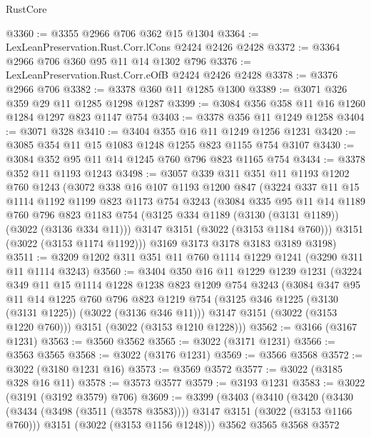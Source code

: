 \begin{lexlean}{RustCore}
\begin{coremodule}
@3360 := @3355 @2966 @706 @362 @15 @1304
@3364 := LexLeanPreservation.Rust.Corr.lCons @2424 @2426 @2428
@3372 := @3364 @2966 @706 @360 @95 @11 @14 @1302 @796
@3376 := LexLeanPreservation.Rust.Corr.eOfB @2424 @2426 @2428
@3378 := @3376 @2966 @706
@3382 := @3378 @360 @11 @1285 @1300
@3389 := @3071 @326 @359 @29 @11 @1285 @1298 @1287
@3399 := @3084 @356 @358 @11 @16 @1260 @1284 @1297 @823 @1147 @754
@3403 := @3378 @356 @11 @1249 @1258
@3404 := @3071 @328
@3410 := @3404 @355 @16 @11 @1249 @1256 @1231
@3420 := @3085 @354 @11 @15 @1083 @1248 @1255 @823 @1155 @754 @3107
@3430 := @3084 @352 @95 @11 @14 @1245 @760 @796 @823 @1165 @754
@3434 := @3378 @352 @11 @1193 @1243
@3498 := @3057
    @339
    @311
    @351
    @11
    @1193
    @1202
    @760
    @1243
    (@3072
      @338
      @16
      @107
      @1193
      @1200
      @847
      (@3224
        @337
        @11
        @15
        @1114
        @1192
        @1199
        @823
        @1173
        @754
        @3243
        (@3084
          @335
          @95
          @11
          @14
          @1189
          @760
          @796
          @823
          @1183
          @754
          (@3125 @334 @1189 (@3130 (@3131 @1189)) (@3022 (@3136 @334 @11)))
          @3147
          @3151
          (@3022 (@3153 @1184 @760)))
        @3151
        (@3022 (@3153 @1174 @1192)))
      @3169
      @3173
      @3178
      @3183
      @3189
      @3198)
@3511 := @3209 @1202 @311 @351 @11 @760 @1114 @1229 @1241 (@3290 @311 @11 @1114 @3243)
@3560 := @3404
    @350
    @16
    @11
    @1229
    @1239
    @1231
    (@3224
      @349
      @11
      @15
      @1114
      @1228
      @1238
      @823
      @1209
      @754
      @3243
      (@3084
        @347
        @95
        @11
        @14
        @1225
        @760
        @796
        @823
        @1219
        @754
        (@3125 @346 @1225 (@3130 (@3131 @1225)) (@3022 (@3136 @346 @11)))
        @3147
        @3151
        (@3022 (@3153 @1220 @760)))
      @3151
      (@3022 (@3153 @1210 @1228)))
@3562 := @3166 (@3167 @1231)
@3563 := @3560 @3562
@3565 := @3022 (@3171 @1231)
@3566 := @3563 @3565
@3568 := @3022 (@3176 @1231)
@3569 := @3566 @3568
@3572 := @3022 (@3180 @1231 @16)
@3573 := @3569 @3572
@3577 := @3022 (@3185 @328 @16 @11)
@3578 := @3573 @3577
@3579 := @3193 @1231
@3583 := @3022 (@3191 (@3192 @3579) @706)
@3609 := @3399
    (@3403
      (@3410
        (@3420
          (@3430 (@3434 (@3498 (@3511 (@3578 @3583)))) @3147 @3151 (@3022 (@3153 @1166 @760)))
          @3151
          (@3022 (@3153 @1156 @1248)))
        @3562
        @3565
        @3568
        @3572

\end{coremodule}
\end{lexlean}
